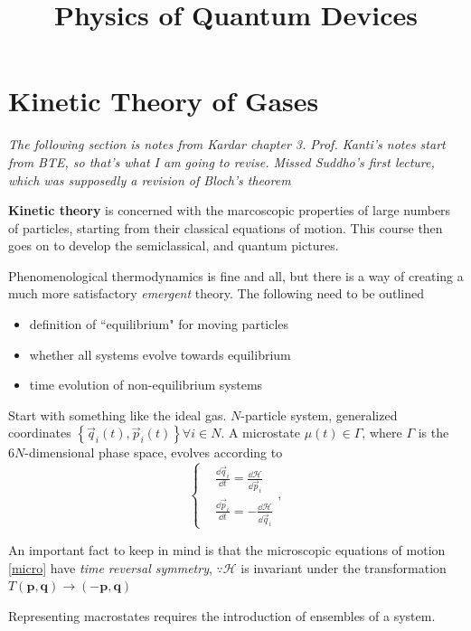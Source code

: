 \documentclass[a4paper]{article}
\title{Physics of Quantum Devices}
\date{}
\begin{document}
\maketitle
\section*{Kinetic Theory of Gases}

\emph{The following section is notes from Kardar chapter 3. Prof. Kanti's notes
start from BTE, so that's what I am going to revise. Missed Suddho's
first lecture, which was supposedly a revision of Bloch's theorem}

\textbf{Kinetic theory} is concerned with the marcoscopic properties
of large numbers of particles, starting from their classical equations
of motion. This course then goes on to develop the semiclassical, and
quantum pictures.

Phenomenological thermodynamics is fine and all, but there is a way
of creating a much more satisfactory \emph{emergent} theory. The
following need to be outlined
\begin{itemize}
	\item definition of ``equilibrium" for moving particles
	\item whether all systems evolve towards equilibrium
	\item time evolution of non-equilibrium systems
\end{itemize}

Start with something like the ideal gas. $N$-particle system, generalized
coordinates $\left\{ \vec{q}_i(t), \vec{p}_i(t) \right\} \forall i \in N$.
A microstate $\mu(t) \in \Gamma$, where $\Gamma$ is the $6N$-dimensional
phase space, evolves according to
\begin{equation} \label{micro}
	\begin{cases}
		&\frac{\dd \vec{q}_i}{\dd t} = \frac{\dd \mathcal{H}}{\dd \vec{p}_i} \\
		&\frac{\dd \vec{p}_i}{\dd t}= -\frac{\dd \mathcal{H}}{\dd \vec{q}_i}
	\end{cases},
\end{equation}

An important fact to keep in mind is that the microscopic equations
of motion \ref{micro} have \emph{time reversal symmetry}, $\because \mathcal{H}$ is invariant under the transformation $T(\mathbf{p, q}) 
\to (-\mathbf{p, q})$

Representing macrostates requires the introduction of ensembles of
a system.
\end{document}

